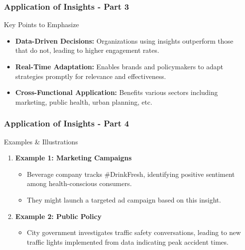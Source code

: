 \documentclass{beamer}
\begin{document}
\begin{frame}[fragile]
    \frametitle{Application of Insights - Part 3}
    \begin{block}{Key Points to Emphasize}
        \begin{itemize}
            \item \textbf{Data-Driven Decisions:} 
                Organizations using insights outperform those that do not, leading to higher engagement rates.
            \item \textbf{Real-Time Adaptation:}
                Enables brands and policymakers to adapt strategies promptly for relevance and effectiveness.
            \item \textbf{Cross-Functional Application:}
                Benefits various sectors including marketing, public health, urban planning, etc.
        \end{itemize}
    \end{block}
\end{frame}

\begin{frame}[fragile]
    \frametitle{Application of Insights - Part 4}
    \begin{block}{Examples & Illustrations}
        \begin{enumerate}
            \item \textbf{Example 1: Marketing Campaigns}
                \begin{itemize}
                    \item Beverage company tracks \#DrinkFresh, identifying positive sentiment among health-conscious consumers. 
                    \item They might launch a targeted ad campaign based on this insight.
                \end{itemize}
            \item \textbf{Example 2: Public Policy}
                \begin{itemize}
                    \item City government investigates traffic safety conversations, leading to new traffic lights implemented from data indicating peak accident times.
                \end{itemize}
        \end{enumerate}
    \end{block}
\end{frame}
\end{document}

